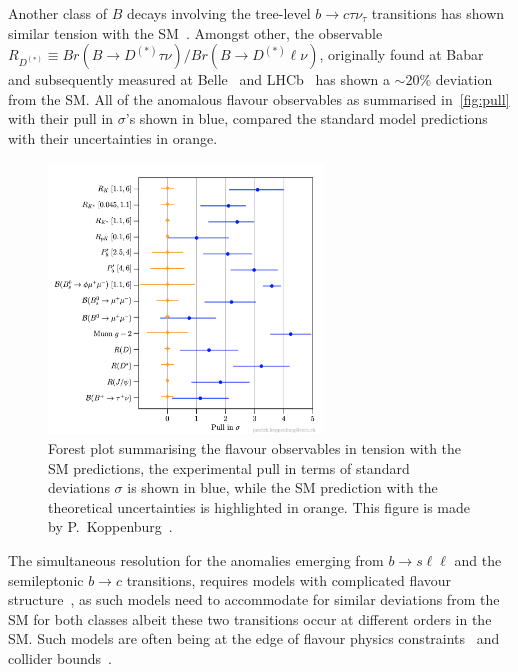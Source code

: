 Another class of $B$ decays involving the tree-level $ b \to c \tau \nu_\tau$ transitions has shown similar tension with the SM~\cite{Azatov:2018knx,Alok:2019uqc,Murgui:2019czp,Shi:2019gxi}. Amongst other, the observable $R_{D^{(*)}} \equiv Br(B \to D^{(*)} \tau \nu) / Br(B \to D^{(*)} \ell \nu)$, originally found at Babar~\cite{Lees:2013uzd} and subsequently measured at Belle~\cite{Huschle:2015rga} and LHCb~\cite{Aaij:2017uff} has shown a $\sim 20\%$ deviation from the SM. All of the anomalous flavour observables as summarised in~\autoref{fig:pull} with their pull in $\sigma$'s shown in blue,  compared the standard model predictions with their uncertainties in orange. \\
 \begin{figure}[ht!]
 	\centering
 	\includegraphics[width=0.65\textwidth]{fig/pull}
 	\caption{ Forest plot summarising the flavour observables in tension with the SM predictions, the experimental pull in terms of standard deviations $\sigma$ is shown in blue, while the SM prediction with the theoretical uncertainties is highlighted in orange. This figure is made by P.~Koppenburg~\cite{Koppenburg:2767155}. }
 	\label{fig:pull}
 \end{figure}
The simultaneous resolution for the anomalies emerging from $ b \to s \ell \ell$ and the semileptonic $b \to c$ transitions, requires models with complicated flavour structure~\cite{DiLuzio:2017vat,Calibbi:2017qbu,Bordone:2017bld,Barbieri:2017tuq,Assad:2017iib,Heeck:2018ntp,Fornal:2018dqn,Crivellin:2018yvo,Crivellin:2019dwb,Bordone:2019uzc}, as such models need to accommodate for similar deviations from the SM for both classes albeit these two transitions occur at different orders in the SM. Such models are often being at the edge of flavour physics constraints~\cite{Bona:2007vi,Silvestrini:2018dos} and collider bounds~\cite{Greljo:2017vvb,Baker:2019sli}.
